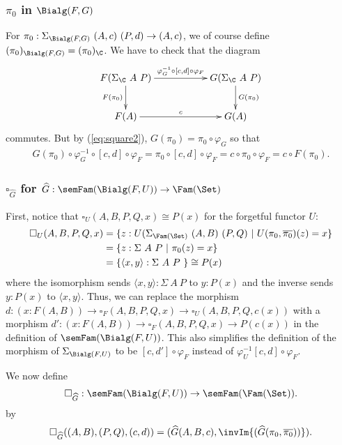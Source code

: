 \documentclass{article}
\begin{document}
\subsubsection{$\pi_0$ in $\Bialg(F, G)$}

For $\pi_0 : \Sigma_{\Bialg(F, G)}\ (A, c)\ (P, d) \to (A, c)$, we of course define $(\pi_0)_{\Bialg(F, G)} = (\pi_0)_{\C}$. We have to check that the diagram
\[
\xymatrix{
F(\Sigma_{\C}\ A\ P) \ar^-{\varphi^{-1}_G \circ [c, d] \circ \varphi_F}[rr] \ar_-{F(\pi_0)}[d] & & G(\Sigma_{\C}\ A\ P) \ar^-{G(\pi_0)}[d] \\
F(A) \ar^-{c}[rr] & & G(A)
}
\]
commutes. But by (\ref{eq:square2}), $G(\pi_0) = \pi_0 \circ \varphi_G$ so that
\begin{align*}
  G(\pi_0) \circ \varphi^{-1}_G \circ [c, d] \circ \varphi_F
  = \pi_0 \circ [c, d] \circ \varphi_F %
  = c \circ \pi_0  \circ \varphi_F %
  = c \circ F(\pi_0).
\end{align*}

\subsubsection{$\square_{\widehat{G}}$ for $\widehat{G} : \semFam(\Bialg(F, U)) \to \Fam(\Set)$}

First, notice that $\square_U(A, B, P, Q, x) \cong P(x)$ for the forgetful functor $U$:
\begin{align*}
\square_U(A, B, P, Q, x)
&= \{ z : U(\Sigma_{\Fam(\Set)}\ (A, B)\ (P, Q)\ |\ U(\pi_0, \overline{\pi_0})(z) = x\} \\
&= \{ z : \Sigma\ A\ P\ |\ \pi_0(z) = x\} \\
&= \{ \langle x, y\rangle : \Sigma\ A\ P\ \} \cong P(x)
\end{align*}
where the isomorphism sends $\langle x, y\rangle : \Sigma\ A\ P$ to $y
: P(x)$ and the inverse sends $y : P(x)$ to $\langle x,
y\rangle$. Thus, we can replace the morphism $d : (x : F(A, B)) \to
\square_F(A, B, P, Q, x) \to \square_U(A, B, P, Q, c(x))$ with a
morphism $d' : (x : F(A, B)) \to \square_F(A, B, P, Q, x) \to P(c(x))$
in the definition of $\semFam(\Bialg(F, U))$. This also simplifies the
definition of the morphism of $\Sigma_{\Bialg(F, U)}$ to be $[c, d']
\circ \varphi_F$ instead of $\varphi^{-1}_U [c, d] \circ \varphi_F$.

We now define
\[
\square_{\widehat{G}} : \semFam(\Bialg(F, U)) \to \semFam(\Fam(\Set)).
\]
by
\[
  \square_{\widehat{G}}((A, B), (P, Q), (c, d)) =
  (\widehat{G}(A, B, c), \invIm{(\widehat{G}(\pi_0, \overline{\pi_0}))}).
\]
\end{document}
